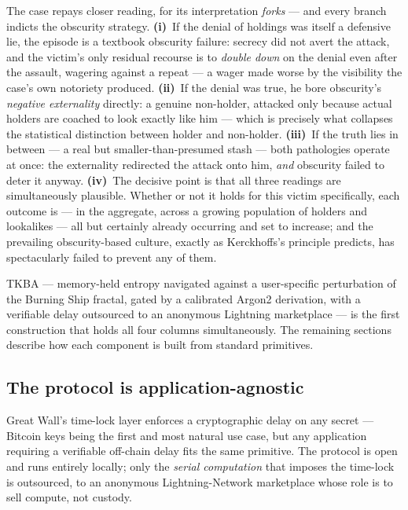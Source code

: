 \documentclass[a4paper,11pt]{article}
\begin{document}
\noindent The case repays closer reading, for its interpretation \emph{forks} --- and every branch indicts the obscurity strategy. \textbf{(i)}~If the denial of holdings was itself a defensive lie, the episode is a textbook obscurity failure: secrecy did not avert the attack, and the victim's only residual recourse is to \emph{double down} on the denial even after the assault, wagering against a repeat --- a wager made worse by the visibility the case's own notoriety produced. \textbf{(ii)}~If the denial was true, he bore obscurity's \emph{negative externality} directly: a genuine non-holder, attacked only because actual holders are coached to look exactly like him --- which is precisely what collapses the statistical distinction between holder and non-holder. \textbf{(iii)}~If the truth lies in between --- a real but smaller-than-presumed stash --- both pathologies operate at once: the externality redirected the attack onto him, \emph{and} obscurity failed to deter it anyway. \textbf{(iv)}~The decisive point is that all three readings are simultaneously plausible. Whether or not it holds for this victim specifically, each outcome is --- in the aggregate, across a growing population of holders and lookalikes --- all but certainly already occurring and set to increase; and the prevailing obscurity-based culture, exactly as Kerckhoffs's principle predicts, has spectacularly failed to prevent any of them.

\noindent TKBA --- memory-held entropy navigated against a user-specific perturbation of the Burning Ship fractal, gated by a calibrated Argon2 derivation, with a verifiable delay outsourced to an anonymous Lightning marketplace --- is the first construction that holds all four columns simultaneously. The remaining sections describe how each component is built from standard primitives.

\subsection{The protocol is application-agnostic}

Great Wall's time-lock layer enforces a cryptographic delay on any secret --- Bitcoin keys being the first and most natural use case, but any application requiring a verifiable off-chain delay fits the same primitive. The protocol is open and runs entirely locally; only the \emph{serial computation} that imposes the time-lock is outsourced, to an anonymous Lightning-Network marketplace whose role is to sell compute, not custody.
\end{document}
